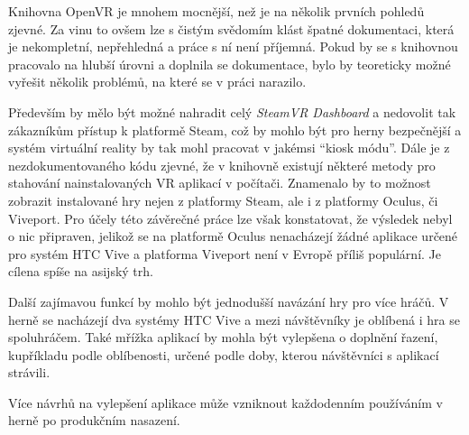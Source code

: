Knihovna OpenVR je mnohem mocnější, než je na několik prvních pohledů
zjevné. Za vinu to ovšem lze s čistým svědomím klást špatné dokumentaci,
která je nekompletní, nepřehledná a práce s ní není příjemná. Pokud by
se s knihovnou pracovalo na hlubší úrovni a doplnila se dokumentace,
bylo by teoreticky možné vyřešit několik problémů, na které se v práci
narazilo.

Především by mělo být možné nahradit celý \emph{SteamVR Dashboard} a
nedovolit tak zákazníkům přístup k platformě Steam, což by mohlo být pro
herny bezpečnější a systém virtuální reality by tak mohl pracovat v
jakémsi ``kiosk módu''. Dále je z nezdokumentovaného kódu zjevné, že v
knihovně existují některé metody pro stahování nainstalovaných VR
aplikací v počítači. Znamenalo by to možnost zobrazit instalované hry
nejen z platformy Steam, ale i z platformy Oculus, či Viveport. Pro
účely této závěrečné práce lze však konstatovat, že výsledek nebyl o nic
připraven, jelikož se na platformě Oculus nenacházejí žádné aplikace
určené pro systém HTC Vive a platforma Viveport není v Evropě příliš
populární. Je cílena spíše na asijský trh.

Další zajímavou funkcí by mohlo být jednodušší navázání hry pro více
hráčů. V herně se nacházejí dva systémy HTC Vive a mezi návštěvníky je
oblíbená i hra se spoluhráčem. Také mřížka aplikací by mohla být vylepšena o
doplnění řazení, kupříkladu podle oblíbenosti, určené podle doby, kterou
návštěvníci s aplikací strávili.

Více návrhů na vylepšení aplikace může vzniknout každodenním používáním
v herně po produkčním nasazení.

